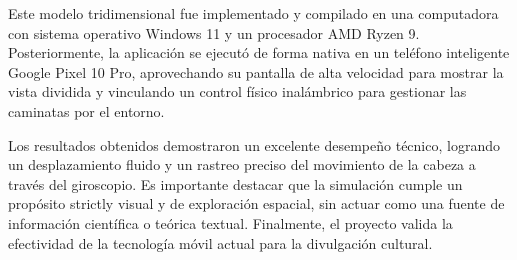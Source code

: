\documentclass[conference]{IEEEtran}
\begin{document}
		Este modelo tridimensional fue implementado y compilado en una computadora con sistema operativo Windows 11 y un procesador AMD Ryzen 9. Posteriormente, la aplicación se ejecutó de forma nativa en un teléfono inteligente Google Pixel 10 Pro, aprovechando su pantalla de alta velocidad para mostrar la vista dividida y vinculando un control físico inalámbrico para gestionar las caminatas por el entorno.
		
		Los resultados obtenidos demostraron un excelente desempeño técnico, logrando un desplazamiento fluido y un rastreo preciso del movimiento de la cabeza a través del giroscopio. Es importante destacar que la simulación cumple un propósito strictly visual y de exploración espacial, sin actuar como una fuente de información científica o teórica textual. Finalmente, el proyecto valida la efectividad de la tecnología móvil actual para la divulgación cultural.
		
		
		\printbibliography
		
		
		
	
\end{document}
